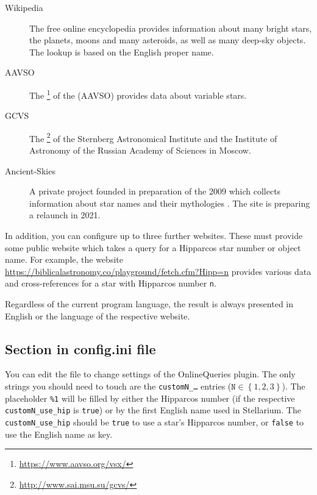 \begin{description}
\item[Wikipedia] The free online encyclopedia provides information
  about many bright stars, the planets, moons and many asteroids, as
  well as many deep-sky objects. The lookup is based on the English
  proper name.
\item[AAVSO] The \footnote{\url{https://www.aavso.org/vsx/}} of the
   (AAVSO)
  provides data about variable stars.
\item[GCVS] The \footnote{\url{http://www.sai.msu.su/gcvs/}} of the Sternberg
  Astronomical Institute and the Institute of Astronomy of the Russian
  Academy of Sciences in Moscow.
\item[Ancient-Skies] A private project founded in preparation of the
   2009 which collects
  information about star names and their mythologies
  \citep{AncientSkies:2011}. The site is preparing a relaunch in 2021.
\end{description}

In addition, you can configure up to three further websites. These
must provide some public website which takes a query for a Hipparcos
star number or object name.  For example, the website
\url{https://biblicalastronomy.co/playground/fetch.cfm?Hipp=n}
provides various data and cross-references for a star with Hipparcos
number \texttt{n}.

Regardless of the current program language, the result is always
presented in English or the language of the respective website.


\subsection{Section  in config.ini file}

You can edit the  file to change settings of the
OnlineQueries plugin.  The only strings you should need to touch are
the \texttt{customN\_\ldots} entries ($\mathtt{N}\in \left\{ 1, 2,
3\right\}$). The placeholder \texttt{\%1} will be filled by either the
Hipparcos number (if the respective \texttt{customN\_use\_hip} is
\texttt{true}) or by the first English name used in Stellarium. The
\texttt{customN\_use\_hip} should be \texttt{true} to use a star's
Hipparcos number, or \texttt{false} to use the English name as key.


